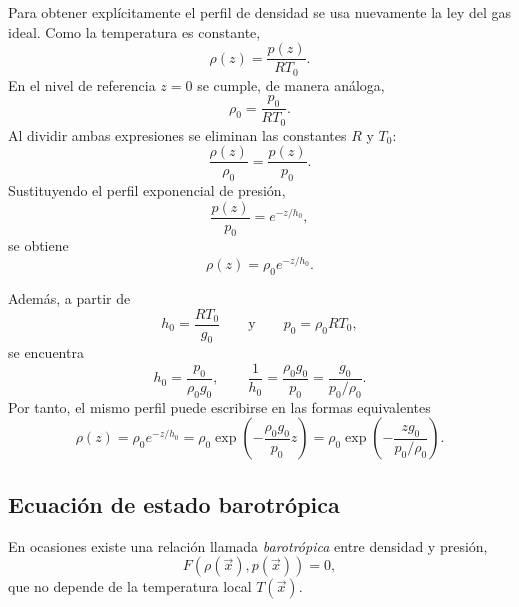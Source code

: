 Para obtener explícitamente el perfil de densidad se usa nuevamente la ley del gas ideal. Como la temperatura es constante,
$$
\rho(z)=\frac{p(z)}{RT_0}.
$$
En el nivel de referencia $z=0$ se cumple, de manera análoga,
$$
\rho_0=\frac{p_0}{RT_0}.
$$
Al dividir ambas expresiones se eliminan las constantes $R$ y $T_0$:
$$
\frac{\rho(z)}{\rho_0}
=\frac{p(z)}{p_0}.
$$
Sustituyendo el perfil exponencial de presión,
$$
\frac{p(z)}{p_0}=e^{-z/h_0},
$$
se obtiene
$$
\boxed{\rho(z)=\rho_0e^{-z/h_0}}.
$$

Además, a partir de
$$
h_0=\frac{RT_0}{g_0}
\qquad\text{y}\qquad
p_0=\rho_0RT_0,
$$
se encuentra
$$
h_0=\frac{p_0}{\rho_0g_0},
\qquad
\frac{1}{h_0}=\frac{\rho_0g_0}{p_0}
=\frac{g_0}{p_0/\rho_0}.
$$
Por tanto, el mismo perfil puede escribirse en las formas equivalentes
$$
\boxed{
\rho(z)
=\rho_0e^{-z/h_0}
=\rho_0\exp\!\left(-\frac{\rho_0g_0}{p_0}z\right)
=\rho_0\exp\!\left(-\frac{zg_0}{p_0/\rho_0}\right)
}.
$$

\figuraAtmosferaIsotermica

\subsection{Ecuación de estado barotrópica}

En ocasiones existe una relación llamada \emph{barotrópica} entre densidad y presión,
$$ F(\rho(\vec{x}), p(\vec{x})) = 0, $$
que no depende de la temperatura local $T(\vec{x})$.

